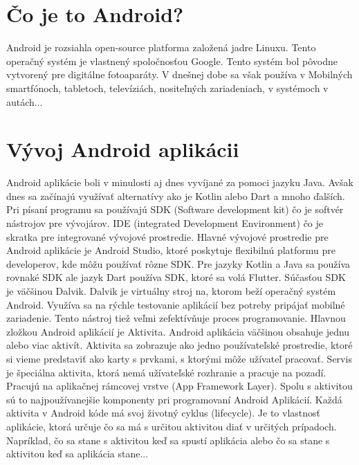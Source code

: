 \documentclass[10pt,twoside,slovak,a4paper]{article}
\begin{document}
\section{Čo je to Android?} \label{Čo je to Android?}
Android je rozsiahla open-source platforma založená jadre Linuxu. Tento operačný systém je vlastnený spoločnosťou Google. Tento systém bol pôvodne vytvorený pre digitálne fotoaparáty. V dnešnej dobe sa však používa v Mobilných smartfónoch, tabletoch, televíziách, nositeľných zariadeniach, v systémoch v autách... 



\section{Vývoj Android aplikácii } \label{Vývoj Android aplikácii}

Android aplikácie boli v minulosti aj dnes vyvíjané za pomoci jazyku Java.\cite{9032440} Avšak dnes sa začínajú využívať alternatívy ako je Kotlin alebo Dart a mnoho ďalších. Pri písaní programu sa používajú SDK (Software development kit) čo je softvér nástrojov pre vývojárov. IDE (integrated Development Environment) čo je skratka pre integrované vývojové prostredie. \newline
Hlavné vývojové prostredie pre Android aplikácie je Android Studio, ktoré poskytuje flexibilnú platformu pre developerov, kde môžu používať rôzne SDK. Pre jazyky Kotlin a Java sa používa rovnaké SDK ale jazyk Dart používa SDK, ktoré sa volá Flutter. \newline
Súčasťou SDK je väčšinou Dalvik. Dalvik je virtuálny stroj na, ktorom beží operačný systém Android. Využíva sa na rýchle testovanie aplikácií bez potreby pripájať mobilné zariadenie. Tento nástroj tiež veľmi zefektívňuje proces programovanie.\newline
Hlavnou zložkou Android aplikácií je Aktivita. Android aplikácia väčšinou obsahuje jednu alebo viac aktivít. Aktivita sa zobrazuje ako jedno používateľské prostredie, ktoré si vieme predstaviť ako karty s prvkami, s ktorými môže užívateľ pracovať.\newline
Servis je špeciálna aktivita, ktorá nemá užívateľské rozhranie a pracuje na pozadí. Pracujú na aplikačnej rámcovej vrstve (App Framework Layer). Spolu s aktivitou sú to najpoužívanejšie komponenty pri programovaní Android Aplikácií. \newline
Každá aktivita v Android kóde má svoj životný cyklus (lifecycle). Je to vlastnosť aplikácie, ktorá určuje čo sa má s určitou aktivitou diať v určitých prípadoch. Napríklad, čo sa stane s aktivitou keď sa spustí aplikácia alebo čo sa stane s aktivitou keď sa aplikácia stane... 
\end{document}
